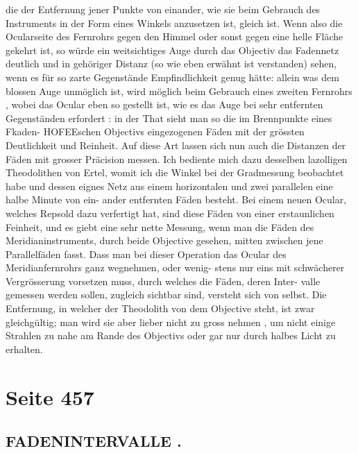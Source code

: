 \documentclass[10pt,a4paper]{article}
\begin{document}
die  der  Entfernung  jener  Punkte  von  einander,  wie  sie  beim  Gebrauch  des  Instruments  in  der  Form
eines  Winkels  anzusetzen  ist,  gleich  ist.  Wenn  also  die  Ocularseite  des  Fernrohrs  gegen  den  Himmel
oder  sonst  gegen  eine  helle  Fläche  gekehrt  ist,  so  würde  ein  weitsichtiges  Auge  durch  das  Objectiv  das
Fadennetz  deutlich  und  in  gehöriger  Distanz  (so  wie  eben  erwähnt  ist  verstanden)  sehen,  wenn  es  für
so  zarte  Gegenstände  Empfindlichkeit  genug  hätte:  allein  was  dem  blossen  Auge  unmöglich  ist,  wird
möglich  beim  Gebrauch  eines  zweiten  Fernrohrs ,  wobei  das  Ocular  eben  so  gestellt  ist,  wie  es  das  Auge
bei  sehr  entfernten  Gegenständen  erfordert :  in  der  That  sieht  man  so  die  im  Brennpunkte  eines  Fkaden-
HOFEEschen  Objectivs  eingezogenen  Fäden  mit  der  grössten  Deutlichkeit  und  Reinheit.  Auf  diese  Art
lassen  sich  nun  auch  die  Distanzen  der  Fäden  mit  grosser  Präcision  messen.  Ich  bediente  mich  dazu
desselben  lazolligen  Theodolithen  von  Ertel,  womit  ich  die  Winkel  bei  der  Gradmessung  beobachtet
habe  und  dessen  eignes  Netz  aus  einem  horizontalen  und  zwei  parallelen  eine  halbe  Minute  von  ein-
ander entfernten  Fäden  besteht.  Bei  einem  neuen  Ocular,  welches  Repsold  dazu  verfertigt  hat,  sind
diese  Fäden  von  einer  erstaunlichen  Feinheit,  und  es  giebt  eine  sehr  nette  Messung,  wenn  man  die
Fäden  des  Meridianinstruments,  durch  beide  Objective  gesehen,  mitten  zwischen  jene  Parallelfäden  fasst.
Dass  man  bei  dieser  Operation  das  Ocular  des  Meridianfernrohrs  ganz  wegnehmen,  oder  wenig-
stens nur  eins  mit  schwächerer  Vergrösserung  vorsetzen  muss,  durch  welches  die  Fäden,  deren  Inter-
valle gemessen  werden  sollen,  zugleich  sichtbar  sind,  versteht  sich  von  selbst.
Die  Entfernung,  in  welcher  der  Theodolith  von  dem  Objective  steht,  ist  zwar  gleichgültig;  man
wird  sie  aber  lieber  nicht  zu  gross  nehmen ,  um  nicht  einige  Strahlen  zu  nahe  am  Rande  des  Objectivs
oder  gar  nur  durch  halbes  Licht  zu  erhalten.

\newpage
\section*{Seite 457}

\subsection*{FADENINTERVALLE .}
\end{document}
